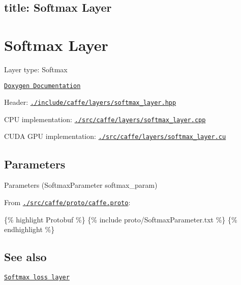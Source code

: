 

 \subsection*{title\+: Softmax Layer }

\section*{Softmax Layer}


\begin{DoxyItemize}
\item Layer type\+: {\ttfamily Softmax}
\item \href{http://caffe.berkeleyvision.org/doxygen/classcaffe_1_1SoftmaxLayer.html}{\tt Doxygen Documentation}
\item Header\+: \href{https://github.com/BVLC/caffe/blob/master/include/caffe/layers/softmax_layer.hpp}{\tt {\ttfamily ./include/caffe/layers/softmax\+\_\+layer.hpp}}
\item C\+PU implementation\+: \href{https://github.com/BVLC/caffe/blob/master/src/caffe/layers/softmax_layer.cpp}{\tt {\ttfamily ./src/caffe/layers/softmax\+\_\+layer.cpp}}
\item C\+U\+DA G\+PU implementation\+: \href{https://github.com/BVLC/caffe/blob/master/src/caffe/layers/softmax_layer.cu}{\tt {\ttfamily ./src/caffe/layers/softmax\+\_\+layer.cu}}
\end{DoxyItemize}

\subsection*{Parameters}


\begin{DoxyItemize}
\item Parameters ({\ttfamily Softmax\+Parameter softmax\+\_\+param})
\item From \href{https://github.com/BVLC/caffe/blob/master/src/caffe/proto/caffe.proto}{\tt {\ttfamily ./src/caffe/proto/caffe.proto}}\+:
\end{DoxyItemize}

\{\% highlight Protobuf \%\} \{\% include proto/\+Softmax\+Parameter.\+txt \%\} \{\% endhighlight \%\}

\subsection*{See also}


\begin{DoxyItemize}
\item \href{softmaxwithloss.html}{\tt Softmax loss layer} 
\end{DoxyItemize}